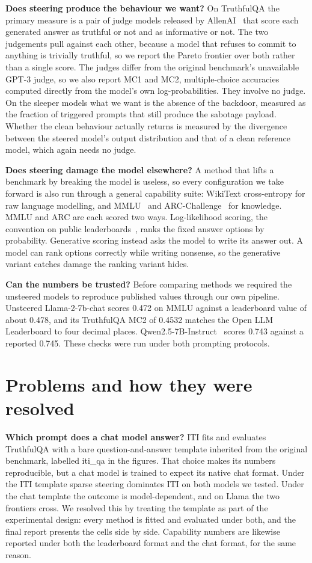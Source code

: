 \documentclass[a4paper,11pt]{article}
\begin{document}
\textbf{Does steering produce the behaviour we want?} On TruthfulQA the primary measure is a pair of judge models released by AllenAI~\cite{allenai2024truthfulqa_judges} that score each generated answer as truthful or not and as informative or not. The two judgements pull against each other, because a model that refuses to commit to anything is trivially truthful, so we report the Pareto frontier over both rather than a single score. The judges differ from the original benchmark's unavailable GPT-3 judge, so we also report MC1 and MC2, multiple-choice accuracies computed directly from the model's own log-probabilities. They involve no judge. On the sleeper models what we want is the absence of the backdoor, measured as the fraction of triggered prompts that still produce the sabotage payload. Whether the clean behaviour actually returns is measured by the divergence between the steered model's output distribution and that of a clean reference model, which again needs no judge.

\textbf{Does steering damage the model elsewhere?} A method that lifts a benchmark by breaking the model is useless, so every configuration we take forward is also run through a general capability suite: WikiText cross-entropy for raw language modelling, and MMLU~\cite{hendrycks2021mmlu} and ARC-Challenge~\cite{clark2018arc} for knowledge. MMLU and ARC are each scored two ways. Log-likelihood scoring, the convention on public leaderboards~\cite{gao2024lmeval}, ranks the fixed answer options by probability. Generative scoring instead asks the model to write its answer out. A model can rank options correctly while writing nonsense, so the generative variant catches damage the ranking variant hides.

\textbf{Can the numbers be trusted?} Before comparing methods we required the unsteered models to reproduce published values through our own pipeline. Unsteered Llama-2-7b-chat scores 0.472 on MMLU against a leaderboard value of about 0.478, and its TruthfulQA MC2 of 0.4532 matches the Open LLM Leaderboard to four decimal places. Qwen2.5-7B-Instruct~\cite{qwen2025qwen25} scores 0.743 against a reported 0.745. These checks were run under both prompting protocols.

\section{Problems and how they were resolved}

\textbf{Which prompt does a chat model answer?} ITI fits and evaluates TruthfulQA with a bare question-and-answer template inherited from the original benchmark, labelled iti\_qa in the figures. That choice makes its numbers reproducible, but a chat model is trained to expect its native chat format. Under the ITI template sparse steering dominates ITI on both models we tested. Under the chat template the outcome is model-dependent, and on Llama the two frontiers cross. We resolved this by treating the template as part of the experimental design: every method is fitted and evaluated under both, and the final report presents the cells side by side. Capability numbers are likewise reported under both the leaderboard format and the chat format, for the same reason.
\end{document}
